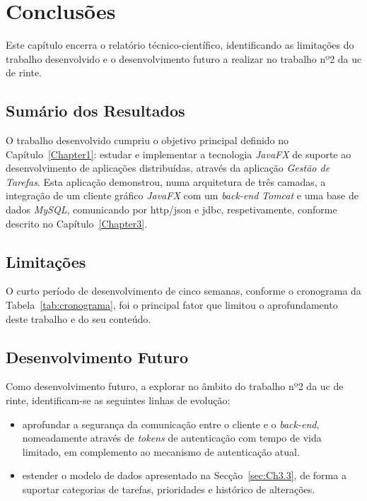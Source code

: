 
\chapter{Conclusões} 	%
\label{Chapter5} 		%

\noindent Este capítulo encerra o relatório técnico-científico, identificando as limitações do trabalho desenvolvido  e o desenvolvimento futuro a realizar no trabalho nº2 da \ac{uc} de \ac{rinte}.



\section{Sumário dos Resultados}
\label{sec:Ch5.1}

\noindent O trabalho desenvolvido cumpriu o objetivo principal definido no Capítulo~\ref{Chapter1}: estudar e implementar a tecnologia \textit{JavaFX} de suporte ao desenvolvimento de aplicações distribuídas, através da aplicação \textit{Gestão de Tarefas}. Esta aplicação demonstrou, numa arquitetura de três camadas, a integração de um cliente gráfico \textit{JavaFX} com um \textit{back-end} \textit{Tomcat} e uma base de dados \textit{MySQL}, comunicando por \ac{http}/\ac{json} e \ac{jdbc}, respetivamente, conforme descrito no Capítulo~\ref{Chapter3}.



\section{Limitações}
\label{sec:Ch5.2}

\noindent O curto período de desenvolvimento de cinco semanas, conforme o cronograma da Tabela~\ref{tab:cronograma}, foi o principal fator que limitou o aprofundamento deste trabalho e do seu conteúdo.

\section{Desenvolvimento Futuro}
\label{sec:Ch5.3}


\noindent Como desenvolvimento futuro, a explorar no âmbito do trabalho nº2 da \ac{uc} de \ac{rinte}, identificam-se as seguintes linhas de evolução:

\begin{itemize}
	\item aprofundar a segurança da comunicação entre o cliente e o \textit{back-end}, nomeadamente através de \textit{tokens} de autenticação com tempo de vida limitado, em complemento ao mecanismo de autenticação atual.
	\item estender o modelo de dados apresentado na Secção~\ref{sec:Ch3.3}, de forma a suportar categorias de tarefas, prioridades e histórico de alterações.
\end{itemize}


